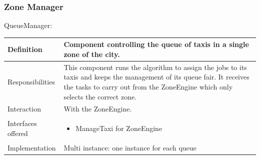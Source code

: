 \documentclass[a4paper,11pt]{report} %
\begin{document}
	\pagebreak
	\subsubsection{Zone Manager}
	\begin{minipage}{\linewidth}
	\end{minipage}	\linebreak
	
	\centerline{QueueManager:}
	\begin{center}
		\begin{tabular}{| l | p{9cm} |}\hline
			Definition & Component controlling the queue of taxis in a single zone of the city.\\\hline
			Responsibilities & This component runs the algorithm to assign the jobs to its taxis and keeps the management of its queue fair. It receives the tasks to carry out from the ZoneEngine which only selects the correct zone.\\\hline
			Interaction & With the ZoneEngine.\\\hline
			Interfaces offered & \begin{itemize}
				\item ManageTaxi for ZoneEngine
			\end{itemize}\\\hline
			Implementation & Multi instance: one instance for each queue\\\hline
		\end{tabular}
	\end{center}
		
\end{document}
